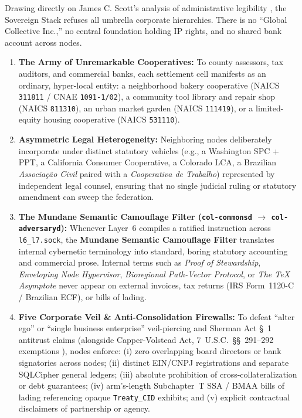 Drawing directly on James C. Scott's analysis of administrative legibility \parencite{scott1998}, the Sovereign Stack refuses all umbrella corporate hierarchies. There is no ``Global Collective Inc.,'' no central foundation holding IP rights, and no shared bank account across nodes.
\begin{enumerate}
    \item \textbf{The Army of Unremarkable Cooperatives:} To county assessors, tax auditors, and commercial banks, each settlement cell manifests as an ordinary, hyper-local entity: a neighborhood bakery cooperative (NAICS \texttt{311811} / CNAE \texttt{1091-1/02}), a community tool library and repair shop (NAICS \texttt{811310}), an urban market garden (NAICS \texttt{111419}), or a limited-equity housing cooperative (NAICS \texttt{531110}).
    \item \textbf{Asymmetric Legal Heterogeneity:} Neighboring nodes deliberately incorporate under distinct statutory vehicles (e.g., a Washington SPC + PPT, a California Consumer Cooperative, a Colorado LCA, a Brazilian \textit{Associa{\c{c}}{\~a}o Civil} paired with a \textit{Cooperativa de Trabalho}) represented by independent legal counsel, ensuring that no single judicial ruling or statutory amendment can sweep the federation.
    \item \textbf{The Mundane Semantic Camouflage Filter (\texttt{col-commonsd} $\to$ \texttt{col-adversaryd}):} Whenever Layer~6 compiles a ratified instruction across \texttt{l6\_l7.sock}, the \textbf{Mundane Semantic Camouflage Filter} translates internal cybernetic terminology into standard, boring statutory accounting and commercial prose. Internal terms such as \textit{Proof of Stewardship}, \textit{Enveloping Node Hypervisor}, \textit{Bioregional Path-Vector Protocol}, or \textit{The \TeX{} Asymptote} never appear on external invoices, tax returns (IRS Form~1120-C / Brazilian ECF), or bills of lading.
    \item \textbf{Five Corporate Veil \& Anti-Consolidation Firewalls:} To defeat ``alter ego'' or ``single business enterprise'' veil-piercing and Sherman Act \S~1 antitrust claims (alongside Capper-Volstead Act, 7~U.S.C.~\S\S~291--292 exemptions \parencite{cappervolstead1922}), nodes enforce: (i) zero overlapping board directors or bank signatories across nodes; (ii) distinct EIN/CNPJ registrations and separate SQLCipher general ledgers; (iii) absolute prohibition of cross-collateralization or debt guarantees; (iv) arm's-length Subchapter~T SSA / BMAA bills of lading referencing opaque \texttt{Treaty\_CID} exhibits; and (v) explicit contractual disclaimers of partnership or agency.
\end{enumerate}

